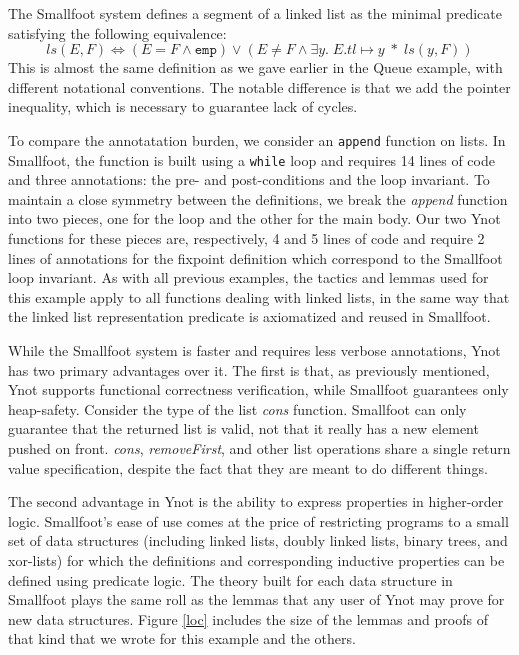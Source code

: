 \documentclass[preprint,nocopyrightspace]{sigplanconf}
\begin{document}
{The Smallfoot system defines a segment of a linked list as the minimal
predicate satisfying the following equivalence:
$$
ls(E,F) \Leftrightarrow (E = F \wedge \mathtt{emp}) \vee (E \neq F \wedge \exists y. \; E.tl \mapsto y \; * \; ls(y,F))
$$
This is almost the same definition as we gave earlier in the Queue example, with different notational conventions.  The notable difference is that we add the pointer inequality, which is necessary to guarantee lack of cycles.

To compare the annotatation burden, we consider an {\tt append} function
on lists. In Smallfoot, the function is
built using a {\tt while} loop and requires 14 lines of code and three
annotations: the pre- and post-conditions and the loop invariant. To
maintain a close symmetry between the definitions, we break the {\it
append} function into two pieces, one for the loop and the other for
the main body. Our two Ynot functions for these pieces are,
respectively, 4 and 5 lines of code and require 2 lines of annotations
for the fixpoint definition which correspond to the Smallfoot loop
invariant. As with all previous examples, the tactics and lemmas used
for this example apply to all functions dealing with linked lists, in
the same way that the linked list representation predicate is
axiomatized and reused in Smallfoot.

While the Smallfoot system is faster and requires less verbose
annotations, Ynot has two primary advantages over it. The first is
that, as previously mentioned, Ynot supports functional correctness
verification, while Smallfoot guarantees only heap-safety. Consider
the type of the list {\it cons} function.  Smallfoot can only
guarantee that the returned list is valid, not that it really has a
new element pushed on front.  {\it cons}, {\it removeFirst}, and other
list operations share a single return value specification, despite the
fact that they are meant to do different things.

The second advantage in Ynot is the ability to express properties in
higher-order logic. Smallfoot's ease of use comes at the price of
restricting programs to a small set of data structures (including
linked lists, doubly linked lists, binary trees, and xor-lists) for which the
definitions and corresponding inductive properties can be defined
using predicate logic. The theory built for each data structure in
Smallfoot plays the same roll as the lemmas that any user of
Ynot may prove for new data structures.  Figure \ref{loc} includes the
size of the lemmas and proofs of that kind that we wrote for this
example and the others.

}
\end{document}
